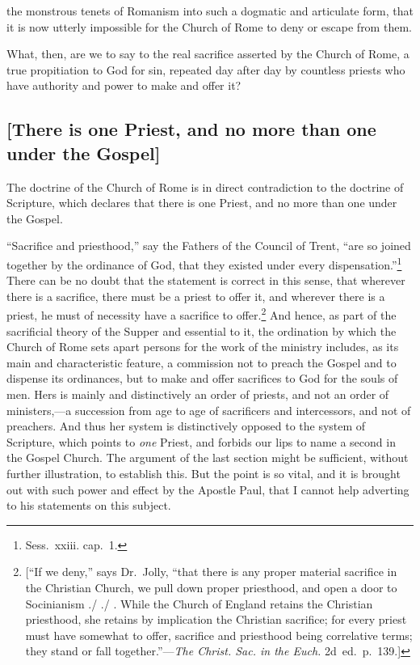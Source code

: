 \documentclass[
]{book}
\begin{document}
the monstrous tenets of Romanism into such a dogmatic and articulate form, that it is now utterly impossible for the Church of Rome to deny or escape from them.

What, then, are we to say to the real sacrifice asserted by the Church of Rome, a true propitiation to God for sin, repeated day after day by countless priests who have authority and power to make and offer it?

\hypertarget{there-is-one-priest-and-no-more-than-one-under-the-gospel}{%
\subsection{{[}There is one Priest, and no more than one under the Gospel{]}}\label{there-is-one-priest-and-no-more-than-one-under-the-gospel}}

The doctrine of the Church of Rome is in direct contradiction to the doctrine of Scripture, which declares that there is one Priest, and no more than one under the Gospel.

``Sacrifice and priesthood,'' say the Fathers of the Council of Trent, ``are so joined together by the ordinance of God, that they existed under every dispensation.''\footnote{Sess.~xxiii. cap.~1.} There can be no doubt that the statement is correct in this sense, that wherever there is a sacrifice, there must be a priest to offer it, and wherever there is a priest, he must of necessity have a sacrifice to offer.\footnote{{[}``If we deny,'' says Dr.~Jolly, ``that there is any proper material sacrifice in the Christian Church, we pull down proper priesthood, and open a door to Socinianism ./ ./ . While the Church of England retains the Christian priesthood, she retains by implication the Christian sacrifice; for every priest must have somewhat to offer, sacrifice and priesthood being correlative terms; they stand or fall together.''---\emph{The Christ. Sac. in the Euch.} 2d~ed.~p.~139.{]}} And hence, as part of the sacrificial theory of the Supper and essential to it, the ordination by which the Church of Rome sets apart persons for the work of the ministry includes, as its main and characteristic feature, a commission not to preach the Gospel and to dispense its ordinances, but to make and offer sacrifices to God for the souls of men. Hers is mainly and distinctively an order of priests, and not an order of ministers,---a succession from age to age of sacrificers and intercessors, and not of preachers. And thus her system is distinctively opposed to the system of Scripture, which points to \emph{one} Priest, and forbids our lips to name a second in the Gospel Church. The argument of the last section might be sufficient, without further illustration, to establish this. But the point is so vital, and it is brought out with such power and effect by the Apostle Paul, that I cannot help adverting to his statements on this subject.
\end{document}
